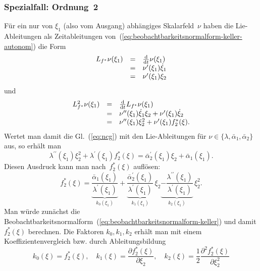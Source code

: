 \subsubsection*{Spezialfall: Ordnung~2}

Für ein nur von $\xi_{1}$ (also vom Ausgang) abhängiges Skalarfeld~$\nu$
haben die Lie-Ableitungen als Zeitableitungen von~(\ref{eq:beobachtbarkeitsnormalform-keller-autonom})
die Form
\begin{equation}
\begin{array}{lcl}
L_{f^{*}}\nu(\xi_{1}) & = & \frac{{\mathrm{d}}}{{\mathrm{d}} t}\nu(\xi_{1})\\
 & = & \nu^{\prime}(\xi_{1})\dot{\xi}_{1}\\
 & = & \nu^{\prime}(\xi_{1})\xi_{2}
\end{array}\label{eq:keller-Lie1}
\end{equation}
und
\[
\begin{array}{lcl}
L_{f^{*}}^{2}\nu(\xi_{1}) & = & \frac{{\mathrm{d}}}{{\mathrm{d}} t}L_{f^{*}}\nu(\xi_{1})\\
 & = & \nu^{\prime\prime}(\xi_{1})\dot{\xi}_{1}\xi_{2}+\nu^{\prime}(\xi_{1})\dot{\xi}_{2}\\
 & = & \nu^{\prime\prime}(\xi_{1})\xi_{2}^{2}+\nu^{\prime}(\xi_{1})f_{2}^{*}(\xi).
\end{array}
\]
Wertet man damit die Gl.~(\ref{eq:ncg}) mit den Lie-Ableitungen
für $\nu\in\{\lambda,\bar{\alpha}_{1},\bar{\alpha}_{2}\}$ aus, so
erhält man
\[
\lambda^{\prime\prime}(\xi_{1})\xi_{2}^{2}+\lambda^{\prime}(\xi_{1})f_{2}^{*}(\xi)=\bar{\alpha}_{2}^{\prime}(\xi_{1})\xi_{2}+\bar{\alpha}_{1}(\xi_{1}).
\]
Diesen Ausdruck kann man nach~$f_{2}^{*}(\xi)$ auflösen:
\begin{equation}
f_{2}^{*}(\xi)=\underbrace{\frac{\bar{\alpha}_{1}(\xi_{1})}{\lambda^{\prime}(\xi_{1})}}_{{\displaystyle k_{0}(\xi_{1})}}+\underbrace{\frac{\bar{\alpha}_{2}^{\prime}(\xi_{1})}{\lambda^{\prime}(\xi_{1})}}_{{\displaystyle k}_{1}(\xi_{1})}\,\xi_{2}\underbrace{-\frac{\lambda^{\prime\prime}(\xi_{1})}{\lambda^{\prime}(\xi_{1})}}_{{\displaystyle k}_{2}(\xi_{1})}\,\xi_{2}^{2}.\label{eq:keller-f2}
\end{equation}
Man würde zunächst die Beobachtbarkeitsnormalform~(\ref{eq:beobachtbarkeitsnormalform-keller})
und damit $f_{2}^{*}(\xi)$ berechnen. Die Faktoren $k_{0},k_{1},k_{2}$
erhält man mit einem Koeffizientenvergleich bzw. durch Ableitungsbildung
\[
k_{0}(\xi)=f_{2}^{*}(\xi),\quad k_{1}(\xi)=\frac{\partial f_{2}^{*}(\xi)}{\partial\xi_{2}},\quad k_{2}(\xi)=\frac{1}{2}\frac{\partial^{2}f_{2}^{*}(\xi)}{\partial\xi_{2}^{2}}
\]
